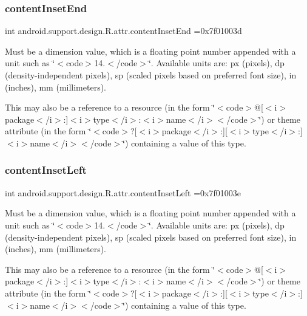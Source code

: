 \subsubsection{\texorpdfstring{content\+Inset\+End}{contentInsetEnd}}
{\footnotesize\ttfamily int android.\+support.\+design.\+R.\+attr.\+content\+Inset\+End =0x7f01003d\hspace{0.3cm}{\ttfamily [static]}}

Must be a dimension value, which is a floating point number appended with a unit such as \char`\"{}$<$code$>$14.\+5sp$<$/code$>$\char`\"{}. Available units are\+: px (pixels), dp (density-\/independent pixels), sp (scaled pixels based on preferred font size), in (inches), mm (millimeters). 

This may also be a reference to a resource (in the form \char`\"{}$<$code$>$@\mbox{[}$<$i$>$package$<$/i$>$\+:\mbox{]}$<$i$>$type$<$/i$>$\+:$<$i$>$name$<$/i$>$$<$/code$>$\char`\"{}) or theme attribute (in the form \char`\"{}$<$code$>$?\mbox{[}$<$i$>$package$<$/i$>$\+:\mbox{]}\mbox{[}$<$i$>$type$<$/i$>$\+:\mbox{]}$<$i$>$name$<$/i$>$$<$/code$>$\char`\"{}) containing a value of this type. \mbox{\label{classandroid_1_1support_1_1design_1_1R_1_1attr_a158a78f4136ee86acfbc3de6d947ee1c}} 
\subsubsection{\texorpdfstring{content\+Inset\+Left}{contentInsetLeft}}
{\footnotesize\ttfamily int android.\+support.\+design.\+R.\+attr.\+content\+Inset\+Left =0x7f01003e\hspace{0.3cm}{\ttfamily [static]}}

Must be a dimension value, which is a floating point number appended with a unit such as \char`\"{}$<$code$>$14.\+5sp$<$/code$>$\char`\"{}. Available units are\+: px (pixels), dp (density-\/independent pixels), sp (scaled pixels based on preferred font size), in (inches), mm (millimeters). 

This may also be a reference to a resource (in the form \char`\"{}$<$code$>$@\mbox{[}$<$i$>$package$<$/i$>$\+:\mbox{]}$<$i$>$type$<$/i$>$\+:$<$i$>$name$<$/i$>$$<$/code$>$\char`\"{}) or theme attribute (in the form \char`\"{}$<$code$>$?\mbox{[}$<$i$>$package$<$/i$>$\+:\mbox{]}\mbox{[}$<$i$>$type$<$/i$>$\+:\mbox{]}$<$i$>$name$<$/i$>$$<$/code$>$\char`\"{}) containing a value of this type. \mbox{\label{classandroid_1_1support_1_1design_1_1R_1_1attr_a6491aa248894c7643f5e77a4a345066c}} 

